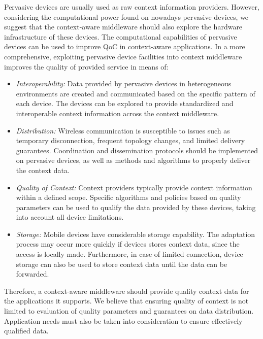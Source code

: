 \documentclass[letterpaper,conference]{IEEEtran}
\begin{document}
 Pervasive devices are usually used as raw context information providers. However, 
 considering the computational power found on nowadays pervasive devices, we suggest 
 that the context-aware middleware should also explore the hardware infrastructure of 
 these devices. The computational capabilities of pervasive devices can be used to improve 
 QoC in context-aware applications. In a more comprehensive, exploiting pervasive device 
 facilities into context middleware improves the quality of provided service in means of:
% 
 \begin{itemize} 
  \item \textit{Interoperability:}  Data provided by pervasive devices in heterogeneous 
 				    environments are created and communicated based on 
 				    the specific pattern of each device. The devices can 
 				    be explored to provide standardized and interoperable
 				    context information across the context middleware.
  
  \item \textit{Distribution:}      Wireless communication is susceptible to issues such 
 				    as temporary disconnection, frequent topology changes,
 				    and limited delivery guarantees. Coordination and 
 				    dissemination protocols should be implemented on 
 				    pervasive devices, as well as methods and algorithms 
 				    to properly deliver the context data.
 				    
  \item \textit{Quality of Context:} Context providers typically provide context 
 				     information within a defined scope. Specific 
 				     algorithms and policies based on quality parameters 
 				     can be used to qualify the data provided by these 
 				     devices, taking into account all device limitations.
 				     
  \item \textit{Storage:}          Mobile devices have considerable storage capability. 
 				   The adaptation process may occur more quickly if 
 				   devices stores context data, since the access is 
 				   locally made. Furthermore, in case of limited connection, 
 				   device storage can also be used to store context data until 
 				   the data can be forwarded. 
 \end{itemize}
 
 
  Therefore, a context-aware middleware should provide quality context data for the 
  applications it supports. We believe that ensuring quality of 
  context is not limited to evaluation of quality parameters and guarantees on data 
  distribution. Application needs must also be taken into consideration to ensure 
  effectively qualified data.
  
\end{document}
